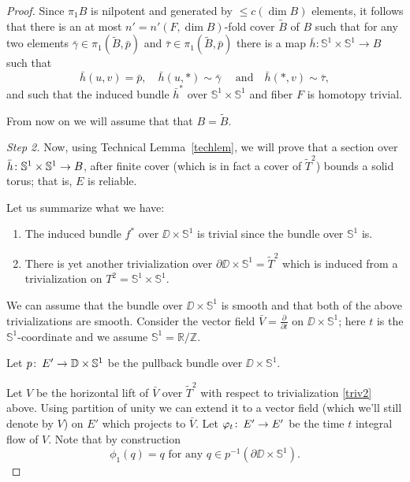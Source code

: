 \documentclass{amsart}
\begin{document}
\begin{proof}
Since $\pi_1 B$ is nilpotent and generated by $\le c(\dim B)$ elements,
it follows that there is  an at most $n'=n'(F,\dim B)$-fold  cover $\widetilde B$ of $B$ such that for any two elements $\bar\gamma\in \pi_1(\tilde B,\bar p)$ and $\bar\tau\in \pi_1(\tilde B,\bar p)$ there is a map 
$\bar h\colon \mathbb{S}^1\times \mathbb{S}^1\to B$ such that 
$$\bar h(u,v)=\bar p,\quad
\bar h(u,*)\sim\bar\gamma\quad\text{ and}\quad
\bar h(*,v)\sim\bar\tau,$$
and such that the induced bundle $\bar h^*$ over $\mathbb{S}^1\times \mathbb{S}^1$ and fiber $F$ is homotopy trivial.

\medskip

From now on we will assume that that $B=\tilde B$.

\medskip

\noindent\textit{Step 2.} 
Now, using Technical Lemma~\ref{techlem}, 
we will prove that a section over 
$\bar h\colon \mathbb{S}^1\z\times \mathbb{S}^1\to B$, after finite cover (which is in fact a cover of $\tilde T^2$) bounds a solid torus;
that is, $ E$ is reliable. 

Let us summarize what we have:

\begin{enumerate}
\item \label{triv1} The  induced bundle $f^*$ over $\DD\times \mathbb{S}^1$ is trivial since the bundle over $\mathbb{S}^1$ is. 
\item \label{triv2} There is yet another  trivialization over $\partial \DD\times \mathbb{S}^1=\widetilde T^2$ which is induced from a  trivialization on $T^2=\mathbb{S}^1\times \mathbb{S}^1$.
\end{enumerate}


We can assume  that the bundle over $\DD\times \mathbb{S}^1$ is smooth and that
 both of the above trivializations are smooth. 
Consider the vector field $\bar V=\frac {\partial }{\partial t}$ on $\DD\times \mathbb{S}^1$;
here $t$ is the $\mathbb{S}^1$-coordinate and we assume $\mathbb{S}^1=\mathbb{R}/\mathbb{Z}$.

Let $p\colon\thinspace E'\to \mathbb{D}\times \mathbb{S}^1$ be the pullback bundle over  $\DD\times \mathbb{S}^1$. 

Let $ V$ be the horizontal lift of $\bar V$ over $\tilde T^2$ with respect to  trivialization \eqref{triv2} above. 
Using partition of unity we can extend it to a vector field (which we'll still denote by $V$) on $E'$  which projects to $\bar V$. 
Let $\varphi_t\colon\thinspace E'\to E'$ be the time $t$ integral flow of $V$. 
Note that by construction 
\begin{equation}\label{monodr-bry}
\phi_1(q)=q \text{ for any } q \in p^{-1}(\partial \DD\times\mathbb{S}^1).
\end{equation}


\end{proof}
\end{document}

